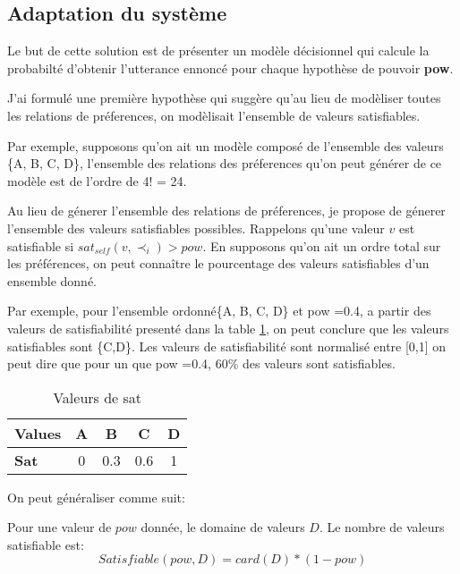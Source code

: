 \documentclass{llncs}
\begin{document}
	
	\subsection{Adaptation du syst\`eme}
	Le but de cette solution est de pr\'esenter un mod\`ele d\'ecisionnel qui calcule la probabilt\'e d'obtenir l'utterance ennonc\'e pour chaque hypoth\`ese de pouvoir \textbf{pow}. 
	
	J'ai formul\'e une premi\`ere hypoth\`ese  qui sugg\`ere qu'au lieu de mod\`eliser toutes les relations de pr\'eferences, on mod\`elisait l'ensemble de valeurs satisfiables.
	
	Par exemple, supposons qu'on ait un mod\`ele compos\'e de l'ensemble des valeurs \{A, B, C, D\}, l'ensemble des relations des pr\'eferences qu'on peut g\'en\'erer de ce mod\`ele est de l'ordre de 4! = 24. 
	
	Au lieu de g\'enerer l'ensemble des relations de pr\'eferences, je propose de g\'enerer l'ensemble des valeurs satisfiables possibles. 
	Rappelons qu'une valeur $v$ est satisfiable si $ sat_{self}(v, \prec_i) > pow$. En supposons qu'on ait un ordre total sur les pr\'ef\'erences, on peut conna\^itre le pourcentage des valeurs satisfiables d'un ensemble donn\'e. 
	
	Par exemple, pour l'ensemble ordonn\'e\{A, B, C, D\} et pow =0.4, a partir des valeurs de satisfiabilit\'e present\'e dans la table \ref{table:conditions}, on peut conclure que les valeurs satisfiables sont \{C,D\}. 
	Les valeurs de satisfiabilit\'e sont normalis\'e entre [0,1] on peut dire que pour un que pow =0.4, 60\% des valeurs  sont satisfiables.
	\begin{table}[h]
		\centering
		\begin{tabular}{ |l|c|c|c|c| }
			\hline
			\textbf{Values}& \textbf{A} & \textbf{B} & \textbf{C} & \textbf{D}\\ 
			\hline
			\newline  \textbf{Sat }& 0 & 0.3 & 0.6 & 1\\ 
			\hline
			
		\end{tabular}
		\caption{Valeurs de sat}
		\label{table:conditions}
	\end{table}
	On peut g\'en\'eraliser comme suit:
	
	Pour une valeur de $pow$ donn\'ee, le domaine de valeurs $D$. Le nombre de valeurs satisfiable est:
	\begin{equation}
	Satisfiable(pow, D)= card(D) * (1-pow)
	\end{equation}
	
\end{document}
